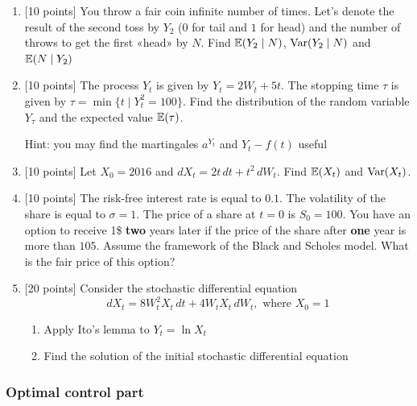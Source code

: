 \documentclass[12pt, a4paper]{article}
\begin{document}
\vspace{10pt}

\begin{enumerate}


\item $[$10 points] You throw a fair coin infinite number of times. 
Let's denote the result of the second toss by $Y_2$ ($0$ for tail and $1$ for head) and the number of throws to get the first «head» by $N$. 
Find $\operatorname{\mathbb{E}}(Y_2 \mid N)$, $\operatorname{Var}(Y_2 \mid N)$ and $\operatorname{\mathbb{E}}(N \mid Y_2)$

\item $[$10 points] The process $Y_t$ is given by $Y_t=2W_t+5t$. The stopping time $\tau$ is given by $\tau=\min\{t \mid Y_t^2=100\}$. Find the distribution of the random variable $Y_\tau$ and the expected value $\operatorname{\mathbb{E}}(\tau)$.


Hint: you may find the martingales $a^{Y_t}$ and $Y_t-f(t)$ useful

\item $[$10 points] Let $X_0 = 2016$ and $dX_t = 2t \, dt + t^2 \, dW_t$. Find $\operatorname{\mathbb{E}}(X_t)$ and $\operatorname{Var}(X_t)$.

\item $[$10 points] The risk-free interest rate is equal to $0.1$. The volatility of the share is equal to $\sigma=1$. The price of a share at $t=0$ is $S_0=100$. You have an option to receive 1\$ \textbf{two} years later if the price of the share after \textbf{one} year is more than $105$. Assume the framework of the Black and Scholes model. What is the fair price of this option?

\item $[$20 points] Consider the stochastic differential equation
\[
dX_t = 8W^2_t X_t \, dt + 4W_t X_t\, dW_t, \text{ where } X_0 = 1
\]

\begin{enumerate}
\item Apply Ito's lemma to $Y_t=\ln X_t$
\item Find the solution of the initial stochastic differential equation
\end{enumerate}

\end{enumerate}


\subsubsection*{Optimal control part}
\end{document}
